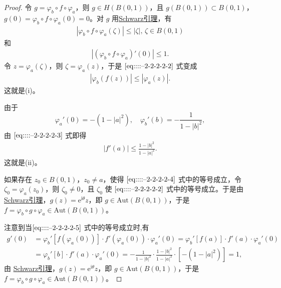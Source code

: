 \documentclass[../../main.tex]{subfiles}%
\begin{document}
\begin{proof}
令 \( g = \varphi_b \circ f \circ \varphi_a \)，则 \( g \in H(B(0,1)) \)，且 \( g(B(0,1)) \subset B(0,1) \)，\( g(0) = \varphi_b \circ f \circ \varphi_a(0) = 0 \)。对 \( g \) 用\hyperref[theorem:Schwarz引理-定理4.5.3]{Schwarz引理}，有
\begin{align}
|\varphi_b \circ f \circ \varphi_a(\zeta)| \leqslant  |\zeta|, \, \zeta \in B(0,1) \label{eq::::--2-2-2-2-2}
\end{align}
和
\begin{align}
|(\varphi_b \circ f \circ \varphi_a)'(0)| \leqslant  1. \label{eq::::--2-2-2-2-3}
\end{align}
令 \( z = \varphi_a(\zeta) \)，则 \( \zeta = \varphi_a(z) \)，于是 \(\eqref{eq::::--2-2-2-2-2}\) 式变成
\begin{align}
|\varphi_b(f(z))| \leqslant  |\varphi_a(z)|. \label{eq::::--2-2-2-2-4}
\end{align}
这就是(i)。

由于
\[
\varphi_a'(0) = - (1 - |a|^2),
\quad
\varphi_b'(b) = - \frac{1}{1 - |b|^2},
\]
由 \(\eqref{eq::::--2-2-2-2-3}\) 式即得
\begin{align}
|f'(a)| \leqslant  \frac{1 - |b|^2}{1 - |a|^2}. \label{eq::::--2-2-2-2-5}
\end{align}
这就是(ii)。

如果存在 \( z_0 \in B(0,1) \)，\( z_0 \neq a \)，使得 \(\eqref{eq::::--2-2-2-2-4}\) 式中的等号成立，令 \( \zeta_0 = \varphi_a(z_0) \)，则 \( \zeta_0 \neq 0 \)，且 \( \zeta_0 \) 使 \(\eqref{eq::::--2-2-2-2-2}\) 式中的等号成立。于是由 \hyperref[theorem:Schwarz引理-定理4.5.3]{Schwarz引理}，\( g(z) = \mathrm{e}^{\mathrm{i}\theta} z \)，即 \( g \in \text{Aut}(B(0,1)) \)，于是 \( f = \varphi_b \circ g \circ \varphi_a \in \text{Aut}(B(0,1)) \)。

注意到当\(\eqref{eq::::--2-2-2-2-5}\) 式中的等号成立时,有
\begin{align*}
g' (0)&=\varphi _{b}'\left[ f\left( \varphi _a\left( 0 \right) \right) \right] \cdot f'\left( \varphi _a\left( 0 \right) \right) \cdot \varphi _{a}'\left( 0 \right) 
=\varphi _{b}'\left[ f\left( a \right) \right] \cdot f' \left( a \right) \cdot \varphi _{a}'\left( 0 \right) 
\\
&=\varphi _{b}'\left[ b \right] \cdot f' \left( a \right) \cdot \varphi _{a}'\left( 0 \right) 
=-\frac{1}{1-|b|^2}\cdot \frac{1-|b|^2}{1-|a|^2}\cdot \left[ -\left( 1-|a|^2 \right) \right] =1,
\end{align*}
由 \hyperref[theorem:Schwarz引理-定理4.5.3]{Schwarz引理}，\( g(z) = \mathrm{e}^{\mathrm{i}\theta} z \)，即 \( g \in \text{Aut}(B(0,1)) \)，于是 \( f = \varphi_b \circ g \circ \varphi_a \in \text{Aut}(B(0,1)) \)。
\end{proof}
\end{document}
